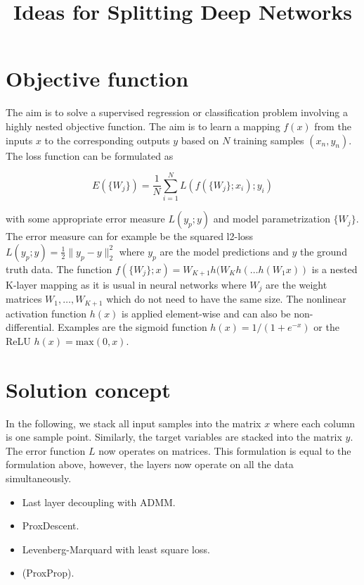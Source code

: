 \documentclass[english,11pt,a4paper]{article}
\title{Ideas for Splitting Deep Networks}
\author{}
\begin{document}
\maketitle


\section{Objective function}

The aim is to solve a supervised regression or classification problem involving a highly nested objective function. The aim is to learn a mapping $f(x)$ from the inputs $x$ to the corresponding outputs $y$ based on $N$ training samples $(x_n, y_n)$. The loss function can be formulated as

\begin{equation}
E(\{W_j\}) = \frac{1}{N} \sum_{i=1}^{N} L(f(\{W_j\};x_i);y_i)
\label{eq:1}
\end{equation}

with some appropriate error measure $L(y_p;y)$ and model parametrization $\{W_j\}$. The error measure can for example be the squared l2-loss $L(y_p;y) = \frac{1}{2} \| y_p - y \|^2_2$ where $y_p$ are the model predictions and $y$ the ground truth data. The function $f(\{W_j\};x) = W_{K+1}h(W_Kh(\dots h(W_1x))$ is a nested K-layer mapping as it is usual in neural networks where $W_j$ are the weight matrices $W_1,\dots,W_{K+1}$ which do not need to have the same size. The nonlinear activation function $h(x)$ is applied element-wise and can also be non-differential. Examples are the sigmoid function $h(x) = 1/(1 + e^{-x})$ or the ReLU $h(x) = \mathrm{max}(0, x)$.

\section{Solution concept}

In the following, we stack all input samples into the matrix $x$ where each column is one sample point. Similarly, the target variables are stacked into the matrix $y$. The error function $L$ now operates on matrices. This formulation is equal to the formulation above, however, the layers now operate on all the data simultaneously.

\begin{itemize}
	\setlength\itemsep{0em}
	\item Last layer decoupling with ADMM.
	\item ProxDescent.
	\item Levenberg-Marquard with least square loss.
	\item (ProxProp).
\end{itemize}
\end{document}
